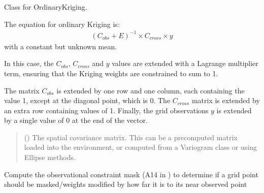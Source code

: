 \documentclass[letterpaper,10pt,english]{sphinxmanual}
\begin{document}
\begin{fulllineitems}
\label{\detokenize{kriging:glomar_gridding.kriging.OrdinaryKriging}}
\pysigstartsignatures
\pysiglinewithargsret
{}
{}
{}
\pysigstopsignatures
\sphinxAtStartPar
Class for OrdinaryKriging.

\sphinxAtStartPar
The equation for ordinary Kriging is:
\begin{equation*}
\begin{split}(C_{obs} + E)^{-1} \times C_{cross} \times y\end{split}
\end{equation*}
\sphinxAtStartPar
with a constant but unknown mean.

\sphinxAtStartPar
In this case, the \(C_{obs}\), \(C_{cross}\) and \(y\) values
are extended with a Lagrange multiplier term, ensuring that the Kriging
weights are constrained to sum to 1.

\sphinxAtStartPar
The matrix \(C_{obs}\) is extended by one row and one column, each
containing the value 1, except at the diagonal point, which is 0. The
\(C_{cross}\) matrix is extended by an extra row containing values of 1.
Finally, the grid observations \(y\) is extended by a single value of 0
at the end of the vector.
\begin{quote}\begin{description}
\sphinxAtStartPar
{} () \textendash{} The spatial covariance matrix. This can be a pre\sphinxhyphen{}computed matrix loaded
into the environment, or computed from a Variogram class or using
Ellipse methods.

\end{description}\end{quote}

\begin{fulllineitems}
\label{\detokenize{kriging:glomar_gridding.kriging.OrdinaryKriging.constraint_mask}}
\pysigstartsignatures
\pysiglinewithargsret
{}
{\sphinxparamcomma {}\sphinxparamcomma {}}
{}
\pysigstopsignatures
\sphinxAtStartPar
Compute the observational constraint mask (A14 in ) to
determine if a grid point should be masked/weights modified by how far
it is to its near observed point


\end{fulllineitems}
\end{fulllineitems}
\end{document}
